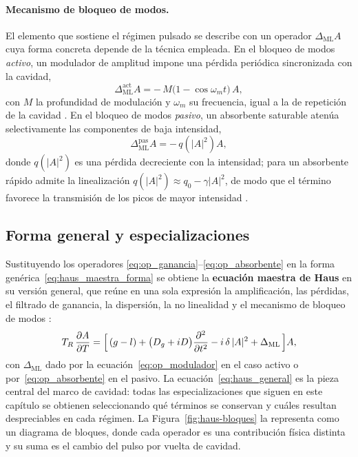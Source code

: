 \paragraph{Mecanismo de bloqueo de modos.}
El elemento que sostiene el régimen pulsado se describe con un operador
$\Delta_{\mathrm{ML}}A$ cuya forma concreta depende de la técnica empleada. En el
bloqueo de modos \emph{activo}, un modulador de amplitud impone una pérdida
periódica sincronizada con la cavidad,
%
\begin{equation}
    \Delta_{\mathrm{ML}}^{\text{act}} A = -\,M\bigl(1-\cos\omega_m t\bigr)\,A,
    \label{eq:op_modulador}
\end{equation}
%
con $M$ la profundidad de modulación y $\omega_m$ su frecuencia, igual a la de
repetición de la cavidad \cite[ecs.~6.47--6.49]{Keller2022}. En el bloqueo de modos \emph{pasivo}, un absorbente
saturable atenúa selectivamente las componentes de baja intensidad,
%
\begin{equation}
    \Delta_{\mathrm{ML}}^{\text{pas}} A = -\,q\!\left(|A|^2\right) A,
    \label{eq:op_absorbente}
\end{equation}
%
donde $q(|A|^2)$ es una pérdida decreciente con la intensidad; para un absorbente
rápido admite la linealización $q(|A|^2)\approx q_0-\gamma|A|^2$, de modo que el
término favorece la transmisión de los picos de mayor intensidad
\cite[ecs.~7.20--7.24]{Keller2022}.

\subsection{Forma general y especializaciones}

Sustituyendo los operadores
\eqref{eq:op_ganancia}--\eqref{eq:op_absorbente} en la
forma genérica~\eqref{eq:haus_maestra_forma} se obtiene la \textbf{ecuación
maestra de Haus} en su versión general, que reúne en una sola expresión la
amplificación, las pérdidas, el filtrado de ganancia, la dispersión, la no
linealidad y el mecanismo de bloqueo de modos \cite[ec.~5.21]{Kaertner2020}:
%
\begin{equation}
    T_R\,\frac{\partial A}{\partial T}
    = \Bigl[\,(g-l)
      + \bigl(D_g + iD\bigr)\frac{\partial^2}{\partial t^2}
      - i\,\delta\,|A|^2
      + \Delta_{\mathrm{ML}} \,\Bigr] A,
    \label{eq:haus_general}
\end{equation}
%
con $\Delta_{\mathrm{ML}}$ dado por la
ecuación~\eqref{eq:op_modulador} en el caso activo o
por~\eqref{eq:op_absorbente} en el pasivo. La
ecuación~\eqref{eq:haus_general} es la pieza central del marco de cavidad: todas
las especializaciones que siguen en este capítulo se obtienen seleccionando qué
términos se conservan y cuáles resultan despreciables en cada régimen. La
Figura~\ref{fig:haus-bloques} la representa como un diagrama de bloques, donde
cada operador es una contribución física distinta y su suma es el cambio del pulso
por vuelta de cavidad.

